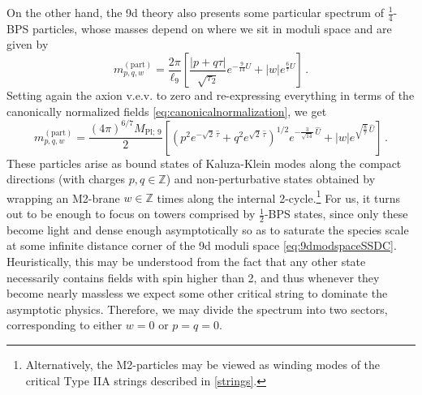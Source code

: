 On the other hand, the 9d theory also presents some particular spectrum of $\frac{1}{4}$-BPS particles, whose masses depend on where we sit in moduli space and are given by \cite{Obers:1998fb}
%
\begin{equation}\label{eq:pqparticles9d}
	m^{(\text{part})}_{p,q,w} = \frac{2\pi}{\ell_{9}} \left[ \frac{|p+q\tau|}{\sqrt{\tau_2}} e^{-\frac{9}{14}U} + |w| e^{\frac{6}{7}U} \right]\, .
\end{equation}
%
Setting again the axion v.e.v. to zero and re-expressing everything in terms of the canonically normalized fields \eqref{eq:canonicalnormalization}, we get 
%
\begin{equation} \label{particles}
  m^{(\text{part})}_{p,q,w} = \frac{(4\pi)^{6/7} M_{\text{Pl};\, 9}}{2} \left[\left( p^2 e^{-\sqrt{2} \,\hat\tau} + q^2 e^{\sqrt{2} \,\hat\tau}\right)^{1/2} e^{-\frac{3}{\sqrt{14}} \, \hat U} + |w| e^{\sqrt{\frac{8}{7}} \, \hat U} \right]\, .
\end{equation}
%
These particles arise as bound states of Kaluza-Klein modes along the compact directions (with charges $p, q \in \mathbb{Z}$) and non-perturbative states obtained by wrapping an M2-brane $w \in \mathbb{Z}$ times along the internal 2-cycle.\footnote{Alternatively, the M2-particles may be viewed as winding modes of the critical Type IIA strings described in \eqref{strings}.} For us, it turns out to be enough to focus on towers comprised by $\frac{1}{2}$-BPS states, since only these become light and dense enough asymptotically so as to saturate the species scale at some infinite distance corner of the 9d moduli space \eqref{eq:9dmodspaceSSDC}. Heuristically, this may be understood from the fact that any other state necessarily contains fields with spin higher than 2, and thus whenever they become nearly massless we expect some other critical string to dominate the asymptotic physics. Therefore, we may divide the spectrum into two sectors, corresponding to either $w=0$ or $p=q=0$. 

